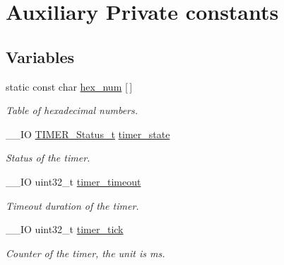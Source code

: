 \hypertarget{group___k_n_x___aux___private___consts}{}\section{Auxiliary Private constants}
\label{group___k_n_x___aux___private___consts}
\subsection*{Variables}
\begin{DoxyCompactItemize}
\item 
static const char \hyperlink{group___k_n_x___aux___private___consts_ga938e545954f0ddfa9a048c6fc3f30776}{hex\+\_\+num} \mbox{[}$\,$\mbox{]}
\begin{DoxyCompactList}\small\item\em Table of hexadecimal numbers. \end{DoxyCompactList}\item 
\+\_\+\+\_\+\+IO \hyperlink{group___k_n_x___aux___exported___types_ga6ed3d972c6c5995cb3fe41995f121b41}{T\+I\+M\+E\+R\+\_\+\+Status\+\_\+t} \hyperlink{group___k_n_x___aux___private___consts_ga40717ccc77c582d2b542fab145329422}{timer\+\_\+state}\hypertarget{group___k_n_x___aux___private___consts_ga40717ccc77c582d2b542fab145329422}{}\label{group___k_n_x___aux___private___consts_ga40717ccc77c582d2b542fab145329422}

\begin{DoxyCompactList}\small\item\em Status of the timer. \end{DoxyCompactList}\item 
\+\_\+\+\_\+\+IO uint32\+\_\+t \hyperlink{group___k_n_x___aux___private___consts_gac31eb4f5e9b0e6b3ba455a8040ee5f64}{timer\+\_\+timeout}\hypertarget{group___k_n_x___aux___private___consts_gac31eb4f5e9b0e6b3ba455a8040ee5f64}{}\label{group___k_n_x___aux___private___consts_gac31eb4f5e9b0e6b3ba455a8040ee5f64}

\begin{DoxyCompactList}\small\item\em Timeout duration of the timer. \end{DoxyCompactList}\item 
\+\_\+\+\_\+\+IO uint32\+\_\+t \hyperlink{group___k_n_x___aux___private___consts_gae2d429094fb9f4b65f422ecc37864377}{timer\+\_\+tick}\hypertarget{group___k_n_x___aux___private___consts_gae2d429094fb9f4b65f422ecc37864377}{}\label{group___k_n_x___aux___private___consts_gae2d429094fb9f4b65f422ecc37864377}

\begin{DoxyCompactList}\small\item\em Counter of the timer, the unit is ms. \end{DoxyCompactList}\end{DoxyCompactItemize}


